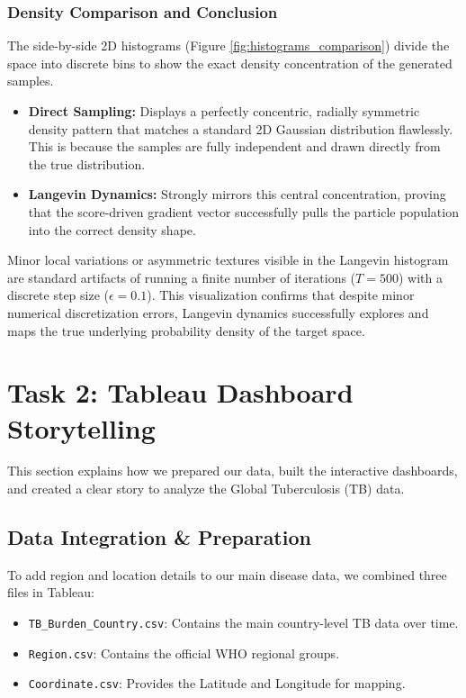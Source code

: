 \documentclass[a4paper,12pt]{extarticle}
\begin{document}
\subsubsection*{Density Comparison and Conclusion}
The side-by-side 2D histograms (Figure \ref{fig:histograms_comparison}) divide the space into discrete bins to show the exact density concentration of the generated samples. 
\begin{itemize}
    \item \textbf{Direct Sampling:} Displays a perfectly concentric, radially symmetric density pattern that matches a standard 2D Gaussian distribution flawlessly. This is because the samples are fully independent and drawn directly from the true distribution.
    \item \textbf{Langevin Dynamics:} Strongly mirrors this central concentration, proving that the score-driven gradient vector successfully pulls the particle population into the correct density shape. 
\end{itemize}
Minor local variations or asymmetric textures visible in the Langevin histogram are standard artifacts of running a finite number of iterations ($T=500$) with a discrete step size ($\epsilon=0.1$). This visualization confirms that despite minor numerical discretization errors, Langevin dynamics successfully explores and maps the true underlying probability density of the target space.


\section{Task 2: Tableau Dashboard Storytelling}
This section explains how we prepared our data, built the interactive dashboards, and created a clear story to analyze the Global Tuberculosis (TB) data.

\subsection{Data Integration \& Preparation}
To add region and location details to our main disease data, we combined three files in Tableau:
\begin{itemize}
    \item \texttt{TB\_Burden\_Country.csv}: Contains the main country-level TB data over time.
    \item \texttt{Region.csv}: Contains the official WHO regional groups.
    \item \texttt{Coordinate.csv}: Provides the Latitude and Longitude for mapping.
\end{itemize}
\end{document}
